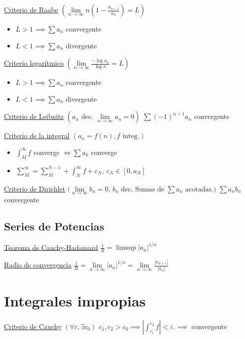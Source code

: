 \documentclass[12pt]{article}
\newcommand{\abs}[1]{\left\vert #1 \right\vert}
\begin{document}
\begin{multicols}{3}
	\underline{Criterio de Raabe}
	$\left( \lim\limits_{n \to \infty} n \left(1 - \frac{a_{n+1}}{a_n}\right)= L \right)$
	\begin{itemize}
		\item $L > 1 \implies \sum a_n$ convergente
		\item $L < 1 \implies \sum a_n$ divergente
	\end{itemize}
	
	\underline{Criterio logarítmico}
	$\left( \lim\limits_{n \to \infty} \frac{-\log{a_n}}{\log{n}} = L \right)$
	\begin{itemize}
		\item $L > 1 \implies \sum a_n$ convergente
		\item $L < 1 \implies \sum a_n$ divergente
	\end{itemize}
	
	\underline{Criterio de Leibnitz} $\left( a_n \text{ dec. } \lim\limits_{n \to \infty}
	a_n = 0 \right)$
	$\sum (-1)^{n+1} a_n$ convergente
	
	\underline{Criterio de la integral} $\left( a_n = f(n), f \text{ integ.} \right)$
	\begin{itemize}
		\item $\int_{M}^{\infty} f$ converge $\iff \sum a_k$ converge
		\item $\sum\limits_{M}^{\infty} = \sum\limits_{M}^{N-1} + \int_{N}^{\infty} f
		+ \varepsilon_N$, $\varepsilon_N \in [0,a_N]$
	\end{itemize}
	
	\underline{Criterio de Dirichlet} $(\lim\limits_{n\to \infty} b_n = 0$, $b_n \text{ dec. Sumas de } \sum a_n
	\text{ acotadas.})$
	$\sum a_nb_n$ convergente
	
	\subsection{Series de Potencias}
	
	\underline{Teorema de Cauchy-Hadamard}
	$\frac{1}{R} = \limsup \abs{a_n}^{1/n}$
	
	\underline{Radio de convergencia}
	$\frac{1}{R} = \lim\limits_{n \to \infty} \abs{a_n}^{1/n} = 
	\lim\limits_{n \to \infty} \frac{\abs{a_{n+1}}}{\abs{a_n}}$
	
	\section{Integrales impropias}
	
	\underline{Criterio de Cauchy} $\left( \forall \varepsilon, \exists c_0 \right)$
	$c_1, c_2 > c_0 \implies \abs{\int_{c_1}^{c_2} f} < \varepsilon. \implies$ convergente
	

\end{multicols}
\end{document}
